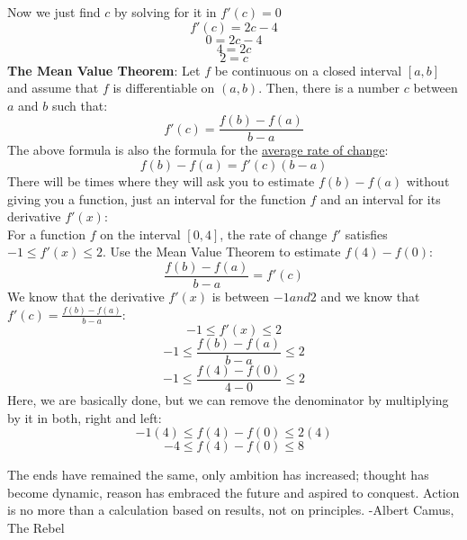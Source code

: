 \documentclass[12pt, letterpaper]{article}
\begin{document}
Now we just find \(c\) by solving for it in \(f'(c) = 0\)
\[f'(c) = 2c-4 \]
\[0 = 2c-4\]
\[4 = 2c\]
\[2 = c\]
\textbf{The Mean Value Theorem}: Let \(f\) be continuous on a closed interval \([a,b]\) and assume that \(f\) is differentiable on \((a,b)\). Then, there is a number \(c\) between \(a\) and \(b\) such that:
\[f'(c)=\frac{f(b)-f(a)}{b-a}\]
The above formula is also the formula for the \underline{average rate of change}:
\[f(b)-f(a)=f'(c)(b-a)\]
There will be times where they will ask you to estimate \(f(b)-f(a)\) without giving you a function, just an interval for the function \(f\) and an interval for its derivative \(f'(x)\):\\
\newline
For a function \(f\) on the interval  \([0,4]\), the rate of change \(f'\) satisfies \(-1 \leq f'(x) \leq 2\). Use the Mean Value Theorem to estimate \(f(4)-f(0)\):
\[\frac{f(b)-f(a)}{b-a}=f'(c)\]
We know that the derivative \(f'(x)\) is between \(-1 and 2\) and we know that \(f'(c) = \frac{f(b)-f(a)}{b-a}\):
\[-1 \leq f'(x) \leq 2\]
\[-1 \leq \frac{f(b)-f(a)}{b-a} \leq 2\]
\[-1 \leq \frac{f(4)-f(0)}{4-0} \leq 2\]
Here, we are basically done, but we can remove the denominator by multiplying by it in both, right and left:
\[-1 (4) \leq f(4)-f(0) \leq 2(4)\]
\[-4 \leq f(4)-f(0)\leq 8\]

The ends have remained the same, only ambition has increased; thought has become dynamic, reason has embraced the future and aspired to conquest. Action is no more than a calculation based on results, not on principles. 
-Albert Camus, The Rebel
\end{document}
